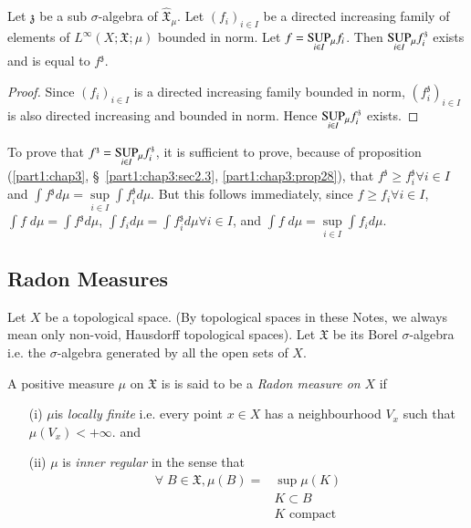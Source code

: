 \begin{proposition}\label{part1:chap3:prop31}
Let $\mathfrak{z}$ be a sub $\sigma$-algebra of
$\hat{\mathfrak{X}}_\mu$. Let $(f_i)_{i \in I}$ be a directed
increasing family of elements of $L^\infty (X; \mathfrak{X}; \mu)$
bounded in norm. Let $f= \underset{i \in I}{\operatorname{SUP}}{}_\mu f_i$. Then
$\underset{i \in I}{\operatorname{SUP}}{}_\mu f^\mathfrak{z}_i$ exists and is equal
to $f^\mathfrak{z}$.
\end{proposition}

\begin{proof}
Since $(f_i)_{i \in I}$ is a directed increasing family bounded in
norm, $(f^\mathfrak{z}_i)_{i \in I} $ is also directed increasing and
bounded in norm. Hence $\underset{i \in I}{\operatorname{SUP}}{}_\mu
f^\mathfrak{z}_i$ exists. 
\end{proof}

To prove that $f^\mathfrak{z} = \underset{i \in I}{\operatorname{SUP}}{}_\mu
f^\mathfrak{z}_i$, it is sufficient to prove, because of proposition
(\ref{part1:chap3}, \S\ \ref{part1:chap3:sec2.3},
\ref{part1:chap3:prop28}), that $f^\mathfrak{z} \geq f^\mathfrak{z}_i
\forall 
i \in I$ and $\int f^\mathfrak{z} d\mu = \sup\limits_{i \in I} \int
f^\mathfrak{z}_i d\mu$. But this follows immediately, since $f \geq
f_i \forall i \in I$, $\int f \; d\mu = \int f^\mathfrak{z} d \mu$,
$\int f_i d \mu = \int f^\mathfrak{z}_i d\mu \forall i \in I$, and
$\int f \; d \mu = \sup\limits_{i \in I} \int f_i d \mu$.  

\subsection{Radon Measures}\label{part1:chap3:sec2.4}

Let $X$ be a topological space. (By topological spaces in these
Notes, we always mean only non-void, Hausdorff topological
spaces). Let $\mathfrak{X}$ be its Borel $\sigma$-algebra i.e. the
$\sigma$-algebra generated by all the open sets of $X$. 

\begin{defn}\label{part1:chap3:def32}
A positive measure $\mu$ on $\mathfrak{X}$ is is said to be a {\em
  Radon measure on } $X$ if 
\begin{itemize}
\item[{\rm (i)}] $\mu$\pageoriginale is {\em locally finite}
  i.e. every point $x \in X$ has a neighbourhood $V_x$ such that
  $\mu(V_x) < + \infty$.  and 

\item[{\rm (ii)}] $\mu$ is {\em inner regular} in the sense that 
\begin{align*}
\forall \; B \in\mathfrak{X}, \mu (B)  = & \sup \mu(K)\\
& K \subset B\\
& K \text{ compact }
\end{align*}
\end{itemize}
\end{defn}

